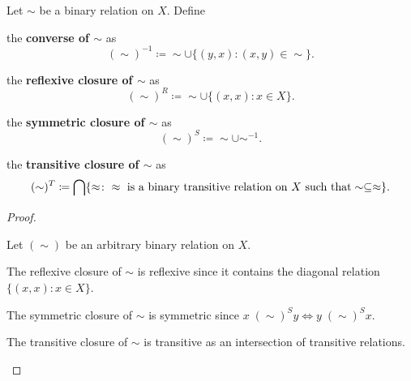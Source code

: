 \begin{definition}\label{def:derived_relations}
  Let \( \sim \) be a binary relation on \( X \). Define
  \begin{defenum}
     the \textbf{converse of \( \sim \)} as
    \begin{equation*}
      (\sim)^{-1} \coloneqq \sim \cup \{ (y, x) \colon (x, y) \in \sim \}.
    \end{equation*}

     the \textbf{reflexive closure of \( \sim \)} as
    \begin{equation*}
      (\sim)^R \coloneqq \sim \cup \{ (x, x) \colon x \in X \}.
    \end{equation*}

     the \textbf{symmetric closure of \( \sim \)} as
    \begin{equation*}
      (\sim)^S \coloneqq \sim \cup \sim^{-1}.
    \end{equation*}

     the \textbf{transitive closure of \( \sim \)} as
    \begin{equation*}
      (\sim)^T \coloneqq \bigcap \{ \approx \colon \approx \text{ is a binary transitive relation on \( X \) such that} \sim \subseteq \approx \}.
    \end{equation*}
  \end{defenum}
\end{definition}
\begin{proof}
\begin{itemize}
  Let \( (\sim) \) be an arbitrary binary relation on \( X \).

  \begin{description}
     The reflexive closure of \( \sim \) is reflexive since it contains the diagonal relation \( \{ (x, x) \colon x \in X \} \).

     The symmetric closure of \( \sim \) is symmetric since \( x \;(\sim)^S y \iff y \;(\sim)^S x \).

     The transitive closure of \( \sim \) is transitive as an intersection of transitive relations.
  \end{description}
\end{itemize}
\end{proof}
